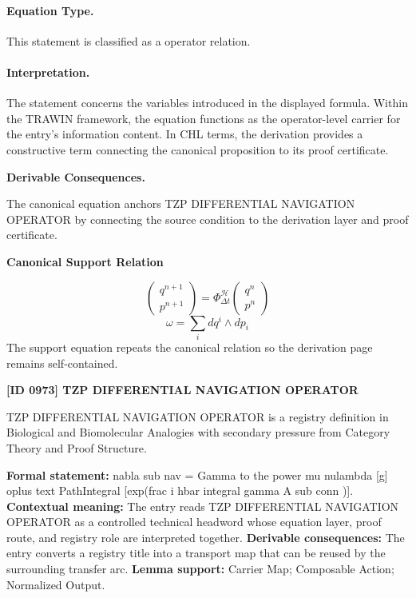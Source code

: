 \paragraph{Equation Type.}
This statement is classified as a operator relation.

\paragraph{Interpretation.}
The statement concerns the variables introduced in the displayed formula. Within the TRAWIN framework, the equation functions as the operator-level carrier for the entry’s information content. In CHL terms, the derivation provides a constructive term connecting the canonical proposition to its proof certificate.

\par\vspace{0.35em}
\noindent\textbf{Derivable Consequences.}\quad
\begingroup
\footnotesize
\raggedright
The canonical equation anchors TZP DIFFERENTIAL NAVIGATION OPERATOR by connecting the source condition to the derivation layer and proof certificate.
\par\endgroup

\noindent\textbf{Canonical Support Relation}\par
\[
\begin{pmatrix}q^{n+1}\\ p^{n+1}\end{pmatrix}
=\Phi_{\Delta t}^{\mathcal{H}}\begin{pmatrix}q^{n}\\ p^{n}\end{pmatrix}
\]
\[
\omega = \sum_i dq^i \wedge dp_i
\]
\noindent The support equation repeats the canonical relation so the derivation page remains self-contained.\par

\clearpage
\noindent\textbf{[ID 0973] TZP DIFFERENTIAL NAVIGATION OPERATOR}\par
\vspace{0.35em}
\begingroup\small
{}
TZP DIFFERENTIAL NAVIGATION OPERATOR is a registry definition in Biological and Biomolecular Analogies with secondary pressure from Category Theory and Proof Structure.

\begingroup\footnotesize\setlength{\emergencystretch}{3em}\sloppy
\textbf{Formal statement:} nabla sub nav = Gamma to the power mu nulambda [g] oplus text PathIntegral [exp(frac i hbar integral gamma A sub conn )]. \textbf{Contextual meaning:} The entry reads TZP DIFFERENTIAL NAVIGATION OPERATOR as a controlled technical headword whose equation layer, proof route, and registry role are interpreted together. \textbf{Derivable consequences:} The entry converts a registry title into a transport map that can be reused by the surrounding transfer arc. \textbf{Lemma support:} Carrier Map; Composable Action; Normalized Output.\par
\endgroup

